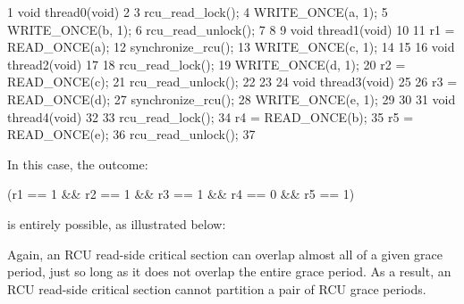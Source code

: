 \begin{VerbatimN}
       1 void thread0(void)
       2 {
       3   rcu_read_lock();
       4   WRITE_ONCE(a, 1);
       5   WRITE_ONCE(b, 1);
       6   rcu_read_unlock();
       7 }
       8
       9 void thread1(void)
      10 {
      11   r1 = READ_ONCE(a);
      12   synchronize_rcu();
      13   WRITE_ONCE(c, 1);
      14 }
      15
      16 void thread2(void)
      17 {
      18   rcu_read_lock();
      19   WRITE_ONCE(d, 1);
      20   r2 = READ_ONCE(c);
      21   rcu_read_unlock();
      22 }
      23
      24 void thread3(void)
      25 {
      26   r3 = READ_ONCE(d);
      27   synchronize_rcu();
      28   WRITE_ONCE(e, 1);
      29 }
      30
      31 void thread4(void)
      32 {
      33   rcu_read_lock();
      34   r4 = READ_ONCE(b);
      35   r5 = READ_ONCE(e);
      36   rcu_read_unlock();
      37 }
\end{VerbatimN}

In this case, the outcome:

\begin{VerbatimU}
      (r1 == 1 && r2 == 1 && r3 == 1 && r4 == 0 && r5 == 1)
\end{VerbatimU}

\noindent%
is entirely possible, as illustrated below:

\begin{center}
\end{center}

Again, an RCU read-side critical section can overlap almost all of a
given grace period, just so long as it does not overlap the entire grace
period.
As a result, an RCU read-side critical section cannot partition
a pair of RCU grace periods.

